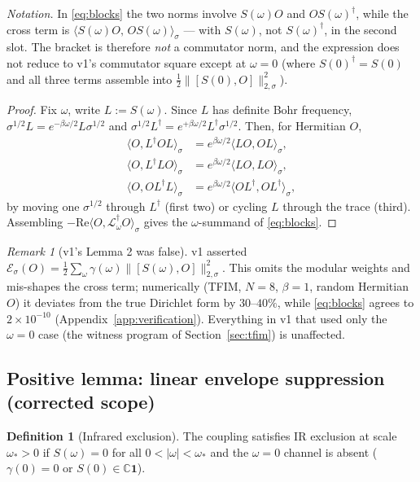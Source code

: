 \documentclass[11pt,a4paper]{article}
\theoremstyle{plain}
\theoremstyle{definition}
\newtheorem{definition}[theorem]{Definition}
\theoremstyle{remark}
\newtheorem{remark}[theorem]{Remark}
\newcommand{\normsig}[1]{\lVert #1 \rVert_{2,\sigma}}
\begin{document}
\noindent\emph{Notation.} In \eqref{eq:blocks} the two norms involve
$S(\omega)O$ and $OS(\omega)^\dagger$, while the cross term is
$\langle S(\omega)O,\, OS(\omega)\rangle_\sigma$ --- with $S(\omega)$, not
$S(\omega)^\dagger$, in the second slot. The bracket is therefore \emph{not}
a commutator norm, and the expression does not reduce to v1's commutator
square except at $\omega = 0$ (where $S(0)^\dagger = S(0)$ and all three
terms assemble into $\tfrac12\normsig{[S(0),O]}^2$).

\begin{proof}
Fix $\omega$, write $L := S(\omega)$. Since $L$ has definite Bohr frequency,
$\sigma^{1/2}L = e^{-\beta\omega/2}L\sigma^{1/2}$ and $\sigma^{1/2}L^\dagger =
e^{+\beta\omega/2}L^\dagger\sigma^{1/2}$. Then, for Hermitian $O$,
\begin{align}
\langle O, L^\dagger O L\rangle_\sigma
&= e^{\beta\omega/2}\langle LO, OL\rangle_\sigma, \\
\langle O, L^\dagger L O\rangle_\sigma
&= e^{\beta\omega/2}\langle LO, LO\rangle_\sigma, \\
\langle O, O L^\dagger L\rangle_\sigma
&= e^{\beta\omega/2}\langle OL^\dagger, OL^\dagger\rangle_\sigma,
\end{align}
by moving one $\sigma^{1/2}$ through $L^\dagger$ (first two) or cycling $L$
through the trace (third). Assembling $-\mathrm{Re}\langle O,
\mathcal{L}^\dagger_\omega O\rangle_\sigma$ gives the $\omega$-summand of
\eqref{eq:blocks}.
\end{proof}

\begin{remark}[v1's Lemma 2 was false]\label{rem:l2false}
v1 asserted $\mathcal{E}_\sigma(O) = \tfrac12\sum_\omega
\gamma(\omega)\normsig{[S(\omega), O]}^2$. This omits the modular weights and
mis-shapes the cross term; numerically (TFIM, $N = 8$, $\beta = 1$, random
Hermitian $O$) it deviates from the true Dirichlet form by $30$--$40\%$,
while \eqref{eq:blocks} agrees to $2\times 10^{-10}$
(Appendix~\ref{app:verification}). Everything in v1 that used only the
$\omega = 0$ case (the witness program of Section~\ref{sec:tfim}) is
unaffected.
\end{remark}

\subsection{Positive lemma: linear envelope suppression (corrected scope)}

\begin{definition}[Infrared exclusion]
The coupling satisfies IR exclusion at scale $\omega_* > 0$ if
$S(\omega) = 0$ for all $0 < |\omega| < \omega_*$ and the $\omega = 0$
channel is absent ($\gamma(0) = 0$ or $S(0) \in \mathbb{C}\mathbf{1}$).
\end{definition}
\end{document}
